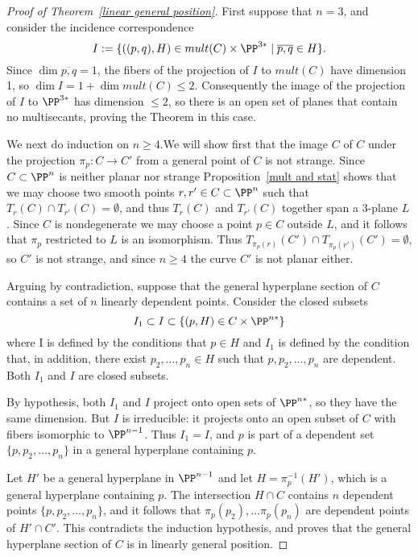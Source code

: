 \begin{proof}[Proof of Theorem~\ref{linear general position}]
First suppose that $n=3$, and consider the incidence correspondence
$$
I := \{ ((p,q), H) \in mult(C) \times \PP^{3*} \mid \overline{p,q}\in H\}.
$$
Since $\dim \overline{p,q} = 1$, the fibers of the projection of $I$ to $mult(C)$ have dimension 1,
so $\dim I = 1+\dim mult(C)  \leq 2$. Consequently the image of  the projection of $I$ to $\PP^{3*}$ has
dimension $\leq 2$, so there is an open set of planes that contain no multisecants, proving the Theorem in this case.

We next do induction on $n\geq 4$.We will show first that the image $C$ of
$C$ under the projection $\pi_p: C\to C'$ from a general point of $C$ is not strange. Since $C\subset \PP^n$ is neither
planar nor strange
Proposition~\ref{mult and stat} shows that we may choose two smooth points
$r,r'\in C\subset \PP^n$ such that $T_r(C)\cap T_{r'}(C) = \emptyset$, and thus 
$T_r(C)$ and $T_{r'}(C)$ together span a 3-plane $L$. Since $C$ is nondegenerate we may
choose a point $p\in C$ outside $L$, and it follows that $\pi_p$ restricted to $L$ is an isomorphism.
Thus $T_{\pi_p(r)}(C') \cap T_{\pi_p({r'})}(C') = \emptyset$, so $C'$ is not strange, 
and since $n\geq 4$ the curve $C'$ is not planar either.

Arguing by contradiction, suppose that the general hyperplane section of $C$ contains a set of $n$ linearly dependent points. Consider the closed subsets  
$$
I_1 \subset I \subset \{(p,H) \in C \times \PP^{n*}\}
$$
where I is defined by the conditions that $p\in H$ and $I_1$ is defined by the condition that, in addition, there exist $p_2,\dots, p_n\in H$
such that $p, p_2, \dots, p_n$ are dependent. Both $I_1$ and $I$ are closed subsets.

By hypothesis, both $I_1$ and $I$ project onto open sets of $\PP^{n*}$, so they have the same dimension.
But $I$ is irreducible: it projects onto an open subset of $C$ with fibers isomorphic to $\PP^{n-1}$. Thus $I_1 = I$,
and  $p$ is part of a dependent set
$\{p, p_2,\dots, p_n\}$ in a general hyperplane containing $p$.

Let $H'$ be a general hyperplane in $\PP^{n-1}$
and let $H = \pi_p^{-1}(H')$, which is a general hyperplane containing $p$. The intersection $H\cap C$
contains $n$ dependent points $\{p, p_2,\dots, p_n\}$, and it follows that $\pi_p(p_2),\dots \pi_p(p_n)$
are dependent points of $H'\cap C'$. This contradicts the induction hypothesis, and proves that
the general hyperplane section of $C$ is in linearly general position.
\end{proof}
 
